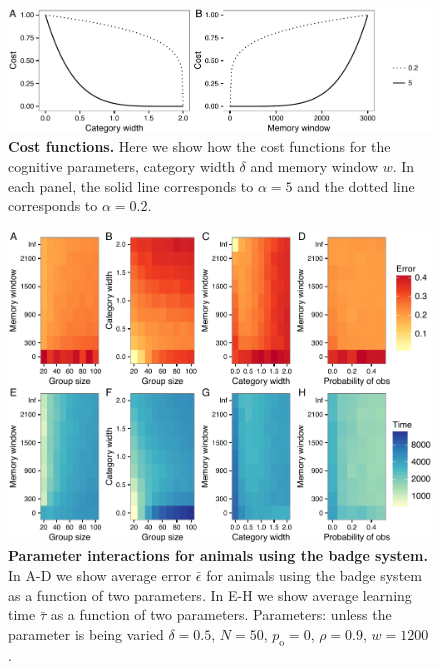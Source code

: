 \begin{figure}[ht]
\includegraphics[width=.8\textwidth]{figures/cost_functions.pdf}
\caption{\sffamily\small\textbf{Cost functions.} Here we show how the cost functions for the cognitive parameters, category width $\delta$ and memory window $w$. In each panel, the solid line corresponds to $\alpha=5$ and the dotted line corresponds to $\alpha=0.2$. }
\label{cost_fx}
\end{figure}


\begin{figure}[ht]
\includegraphics[width=.8\textwidth]{figures/parameter_interactions_badge.pdf}
\caption{\sffamily\small\textbf{Parameter interactions for animals using the badge system.}
In A-D we show average error $\bar{\epsilon}$ for animals using the badge system as a function of two parameters. In E-H we show average learning time $\bar{\tau}$ as a function of two parameters. Parameters: unless the parameter is being varied $\delta = 0.5$, $N=50$, $p_\text{o}=0$, $\rho=0.9$, $w=1200$.}
\label{interactions_badge}
\end{figure}

